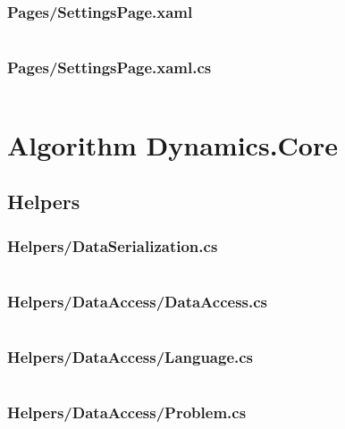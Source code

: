 \documentclass[a4paper]{report}
\begin{document}
\subsubsection{Pages/SettingsPage.xaml}

\inputminted{xml}{"../src/Algorithm Dynamics/Pages/SettingsPage.xaml"}

\subsubsection{Pages/SettingsPage.xaml.cs}

\inputminted{csharp}{"../src/Algorithm Dynamics/Pages/SettingsPage.xaml.cs"}

\section{Algorithm Dynamics.Core}

\subsection{Helpers}

\subsubsection{Helpers/DataSerialization.cs}

\inputminted{csharp}{"../src/Algorithm Dynamics.Core/Helpers/DataSerialization.cs"}

\subsubsection{Helpers/DataAccess/DataAccess.cs}

\inputminted{csharp}{"../src/Algorithm Dynamics.Core/Helpers/DataAccess/DataAccess.cs"}

\subsubsection{Helpers/DataAccess/Language.cs}

\inputminted{csharp}{"../src/Algorithm Dynamics.Core/Helpers/DataAccess/Language.cs"}

\subsubsection{Helpers/DataAccess/Problem.cs}

\inputminted{csharp}{"../src/Algorithm Dynamics.Core/Helpers/DataAccess/Problem.cs"}
\end{document}
